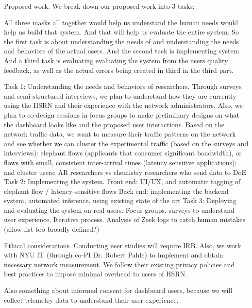 Proposed work. We break down our proposed work into 3 tasks:

All three masks all together would help us understand the human needs would help us build that system. And that will help us evaluate the entire system. So the first task is about understanding the needs of and understanding the needs and behaviors of the actual users. And the second task is implementing system. And a third task is evaluating evaluating the system from the users quality feedback, as well as the actual errors being created in third in the third part.

Task 1: Understanding the needs and behaviors of researchers.
Through surveys and semi-structured interviews, we plan to understand how they are currently using the HSRN and their experience with the network administrators. Also, we plan to co-design sessions in focus groups to make preliminary designs on what the dashboard looks like and the proposed user interactions.
Based on the network traffic data, we want to measure their traffic patterns on the network and see whether we can cluster the experimental traffic (based on the surveys and interviews): elephant flows (applicants that consumer significant bandwidth), or flows with small, consistent inter-arrival times (latency sensitive applications); and cluster users: AR researchers vs chemistry researchers who send data to DoE
Task 2: Implementing the system.
Front end: UI/UX, and automatic tagging of elephant flow / latency-sensitive flows
Back end: implementing the backend system, automated inference, using existing state of the art
Task 3: Deploying and evaluating the system on real users.
Focus groups, surveys to understand user experience. Iterative process.
Analysis of Zeek logs to catch human mistakes (allow list too broadly defined?)

Ethical considerations. Conducting user studies will require IRB. Also, we work with NYU IT (through co-PI Dr. Robert Pahle) to implement and obtain necessary network measurement. We follow their existing privacy policies and best practices to impose minimal overhead to users of HSRN.

Also something about informed consent for dashboard users, because we will collect telemetry data to understand their user experience.


